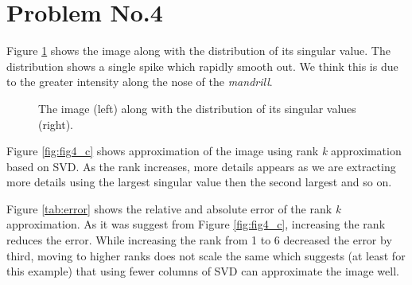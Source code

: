 \section*{Problem No.4} \label{sec:prob4}
Figure \ref{fig:fig4_ab} shows the image along with the distribution of its singular value. The distribution shows a single spike which rapidly smooth out. We think this is due to the greater intensity along the nose of the \emph{mandrill}. 

\begin{figure}[tbh]
\centering        
   \caption{ The image (left) along with the distribution of its singular values (right).}
   \label{fig:fig4_ab}
\end{figure}


Figure \ref{fig:fig4_c} shows approximation of the image using rank \emph{k} approximation based on SVD. As the rank increases, more details appears as we are extracting more details using the largest singular value then the second largest and so on. 

Figure \ref{tab:error} shows the relative and absolute error of the rank \emph{k} approximation. As it was suggest from Figure \ref{fig:fig4_c}, increasing the rank reduces the error. While increasing the rank from 1 to 6 decreased the error by third, moving to higher ranks does not scale the same which suggests (at least for this example) that using fewer columns of SVD can approximate the image well. 
 
